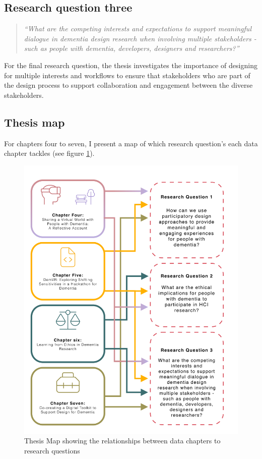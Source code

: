 \subsection{Research question three}
\label{RQ3}
\begin{quote}
\textit{``What are the competing interests and expectations to support meaningful dialogue in dementia design research when involving multiple stakeholders - such as people with dementia, developers, designers and researchers?''}
\end{quote}
For the final research question, the thesis investigates the importance of designing for multiple interests and workflows to ensure that stakeholders who are part of the design process to support collaboration and engagement between the diverse stakeholders. 


\subsection{Thesis map}
For chapters four to seven, I present a map of which research question's each data chapter tackles (see figure \ref{fig:RQ_and_Chapters}).

\label{Intro:Thesis Map}
\begin{figure}[htp]
\centering
\includegraphics[width=.8\linewidth]{Images/Thesis_Narrative/RQ_and_Chapters.png}
\caption{Thesis Map showing the relationships between data chapters to research questions}
\label{fig:RQ_and_Chapters}
\end{figure}


